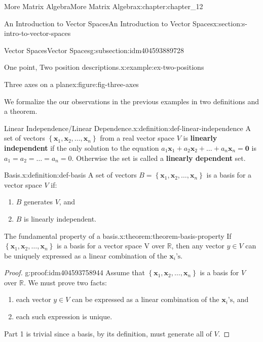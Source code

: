 \documentclass[twoside,10pt,]{book}
\newcommand{\terminology}[1]{\textbf{#1}}
\numberwithin{equation}{section}
\renewcommand{\vec}[1]{\mathbf{#1}}
\begin{document}
\begin{chapterptx}{More Matrix Algebra}{}{More Matrix Algebra}{}{}{x:chapter:chapter_12}
\begin{sectionptx}{An Introduction to Vector Spaces}{}{An Introduction to Vector Spaces}{}{}{x:section:s-intro-to-vector-spaces}
\begin{subsectionptx}{Vector Spaces}{}{Vector Spaces}{}{}{g:subsection:idm404593889728}
\begin{example}{One point, Two position descriptions.}{x:example:ex-two-positions}
\begin{figureptx}{Three axes on a plane}{x:figure:fig-three-axes}{}
\begin{image}{0.25}{0.5}{0.25}
\end{image}%
\tcblower
\end{figureptx}%
\end{example}
We formalize the our observations in the previous examples in two definitions and a theorem.%
\begin{definition}{Linear Independence\slash{}Linear Dependence.}{x:definition:def-linear-independence}%
%
%
A set of vectors \(\left\{\vec{x}_1,\vec{x}_2, \ldots ,\vec{x}_n\right\}\) from a real vector space \(V\)  is \terminology{linearly independent} if the only solution to the equation \(a_1 \vec{x}_1+a_2 \vec{x}_2+\ldots
+a_n \vec{x}_n= \vec{0}\) is  \(a_1 = a_2 = \ldots  = a_n = 0\). Otherwise the set is called a \terminology{linearly dependent} set.%
\end{definition}
\begin{definition}{Basis.}{x:definition:def-basis}%
%
A set of vectors \(B=\left\{\vec{x}_1,\vec{x}_2, \ldots ,\vec{x}_n\right\}\) is a basis for a vector space \(V\) if:%
\begin{enumerate}[label=(\arabic*)]
\item{}\(B\) generates \(V\), and%
\item{}\(B\) is linearly independent.%
\end{enumerate}
%
\end{definition}
\begin{theorem}{The fundamental property of a basis.}{}{x:theorem:theorem-basis-property}%
If \(\left\{\vec{x}_1,\vec{x}_2, \ldots ,\vec{x}_n\right\}\) is a basis for a vector space V over \(\mathbb{R}\), then any vector \(y \in V\) can be uniquely expressed as a linear combination of the \(\vec{x}_i\textrm{'s}\).%
\end{theorem}
\begin{proof}{}{g:proof:idm404593758944}
Assume that \(\left\{\vec{x}_1,\vec{x}_2, \ldots ,\vec{x}_n\right\}\) is a basis for \(V\) over \(\mathbb{R}\). We must prove two facts:%
\begin{enumerate}[label=(\arabic*)]
\item{}each vector \(y \in V\) can be expressed as a linear combination of the \(\vec{x}_i\textrm{'s}\), and%
\item{}each such expression is unique.%
\end{enumerate}
%
\par
Part 1 is trivial since a basis, by its definition, must generate all of  \(V\).%
\par

\end{proof}
\end{subsectionptx}
\end{sectionptx}
\end{chapterptx}
\end{document}
